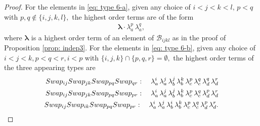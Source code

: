 \documentclass[10pt,a4paper]{amsart}
\begin{document}
\begin{proof}
	
	For the elements in \eqref{eq: type 6-a}, given any choice of $i < j < k < l,\, p<q$ with $p,q \notin \{i,j,k,l\},$ the highest order terms are of the form
	\begin{align*}
		\boldsymbol{\lambda} \cdot \lambda_a^p\, \lambda_a^q,
	\end{align*}
	where $\boldsymbol{\lambda}$ is a highest order term of an element of $\mathcal{B}_{ijkl}$ as in the proof of Proposition \ref{prop: indep3}.
	For the elements in \eqref{eq: type 6-b}, given any choice of $i < j < k, p<q<r, i<p$ with $\{i,j,k\} \cap \{p,q,r\} = \emptyset,$ the highest order terms of the three appearing types are
	\begin{align*}
		\textnormal{Swap}_{ij} \textnormal{Swap}_{jk} \textnormal{Swap}_{pq} \textnormal{Swap}_{qr}: \quad  
		\lambda_a^i\, \lambda_a^j\, \lambda_b^j\, \lambda_b^k\, \lambda_c^p\, \lambda_c^q\, \lambda_d^q\, \lambda_d^r\\
		\textnormal{Swap}_{ij} \textnormal{Swap}_{jk} \textnormal{Swap}_{pq} \textnormal{Swap}_{pr}: \quad  
		\lambda_a^i\, \lambda_a^j\, \lambda_b^j\, \lambda_b^k\, \lambda_c^p\, \lambda_c^q\, \lambda_d^p\, \lambda_d^r\\
		\textnormal{Swap}_{ij} \textnormal{Swap}_{ik} \textnormal{Swap}_{pq} \textnormal{Swap}_{pr}: \quad  
		\lambda_a^i\, \lambda_a^j\, \lambda_b^i\, \lambda_b^k\, \lambda_c^p\, \lambda_c^q\, \lambda_d^p\, \lambda_d^r.
	\end{align*}




\end{proof}
\end{document}
